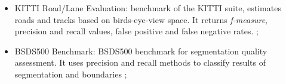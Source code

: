 \begin{itemize}
 \item KITTI Road/Lane Evaluation: benchmark of the KITTI suite, estimates roads and tracks based on birds-eye-view space. It returns \textit{f-measure}, precision and recall values, false positive and false negative rates. \cite{Fritsch2013ITSC};
 
 \item BSDS500 Benchmark: BSDS500 benchmark for segmentation quality assessment. It uses precision and recall methods to classify results of segmentation and boundaries \cite{amfm_pami2011};
 
\end{itemize}

% 
% 
%  
%  
%  
%  

